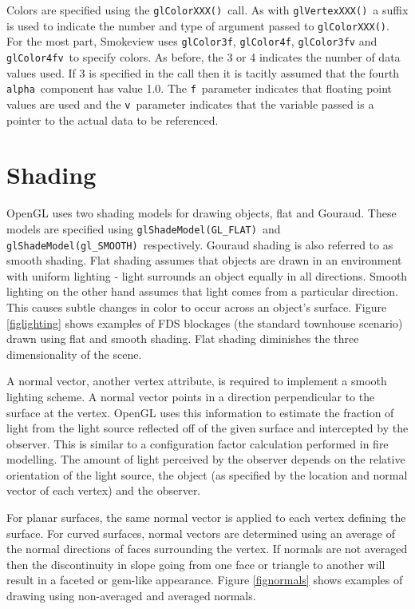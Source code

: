 \documentclass[11pt,twoside]{book}
\begin{document}
Colors are specified using the {\tt glColorXXX()}\ call.  As with {\tt glVertexXXX()}\ a suffix is used to indicate the number and type of argument passed to {\tt glColorXXX()}.  For the most part, Smokeview uses {\tt glColor3f}, {\tt glColor4f}, {\tt glColor3fv} and {\tt glColor4fv}\ to specify colors.  As before, the 3 or 4 indicates the number of data values used.  If 3 is specified in the call then it is tacitly assumed that the fourth {\tt alpha}\ component has value 1.0.  The {\tt f}\ parameter indicates that floating point values are used and the {\tt v}\ parameter indicates that the variable passed is a pointer to the actual data to be referenced.

\section{Shading} OpenGL uses two shading models for drawing
objects, flat and Gouraud.  These models are specified
using {\tt glShadeModel(GL\_FLAT)}\ and {\tt glShadeModel(gl\_SMOOTH)}\
respectively.
Gouraud shading is also
referred to as smooth shading.  Flat shading assumes that objects
are drawn in an environment with uniform lighting - light
surrounds an object equally in all directions. Smooth lighting on
the other hand assumes that light comes from a particular
direction.  This causes subtle changes in color to occur across an
object's surface. Figure \ref{figlighting} shows examples of FDS
blockages (the standard townhouse scenario) drawn using flat and
smooth shading. Flat shading diminishes the three dimensionality of
the scene.

A normal vector, another vertex attribute, is required to
implement a smooth lighting scheme. A normal vector points in a
direction perpendicular to the surface at the vertex. OpenGL uses
this information to estimate the fraction of light from the light
source reflected off of the given surface and intercepted by the
observer.  This is similar to a configuration factor calculation
performed in fire modelling.  The amount of light perceived by the
observer depends on the relative orientation of the light source,
the object (as specified by the location and normal vector of each
vertex) and the observer.

For planar surfaces, the same normal vector is applied to each
vertex defining the surface. For curved surfaces, normal vectors
are determined using an average of the normal directions of faces
surrounding the vertex.  If normals are not averaged then the
discontinuity in slope going from one face or triangle to another
will result in a faceted or gem-like appearance.  Figure
\ref{fignormals} shows examples of drawing using non-averaged and
averaged normals.
\end{document}
